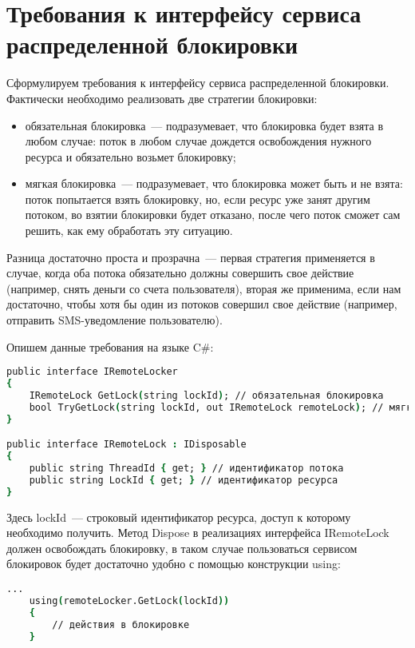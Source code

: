 \section{Требования к интерфейсу сервиса распределенной блокировки}

Сформулируем требования к интерфейсу сервиса распределенной блокировки. Фактически необходимо реализовать две стратегии блокировки:

\begin{itemize} 
	\item обязательная блокировка~--- подразумевает, что блокировка будет взята в любом случае: поток в любом случае дождется освобождения нужного ресурса и обязательно возьмет блокировку;
	\item мягкая блокировка~--- подразумевает, что блокировка может быть и не взята: поток попытается взять блокировку, но, если ресурс уже занят другим потоком, во взятии блокировки будет отказано, после чего поток сможет сам решить, как ему обработать эту ситуацию.
\end{itemize}

Разница достаточно проста и прозрачна~--- первая стратегия применяется в случае, когда оба потока обязательно должны совершить свое действие (например, снять деньги со счета пользователя), вторая же применима, если нам достаточно, чтобы хотя бы один из потоков совершил свое действие (например, отправить SMS-уведомление пользователю). 

Опишем данные требования на языке C\#:

\begin{lstlisting}[language=csh,caption={Описание интерфейса}]
public interface IRemoteLocker
{
	IRemoteLock GetLock(string lockId); // обязательная блокировка
	bool TryGetLock(string lockId, out IRemoteLock remoteLock); // мягкая блокировка
}

public interface IRemoteLock : IDisposable
{
	public string ThreadId { get; } // идентификатор потока
	public string LockId { get; } // идентификатор ресурса
}
\end{lstlisting}

Здесь lockId~--- строковый идентификатор ресурса, доступ к которому необходимо получить. Метод Dispose в реализациях интерфейса IRemoteLock должен освобождать блокировку, в таком случае пользоваться сервисом блокировок будет достаточно удобно с помощью конструкции using:

\begin{lstlisting}[language=csh,caption={Использование конструкции using}]
	...
	using(remoteLocker.GetLock(lockId))
	{
		// действия в блокировке
	}
\end{lstlisting}
